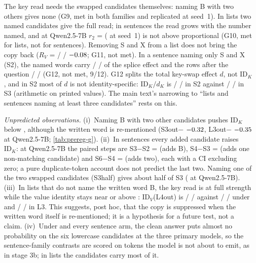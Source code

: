 The key read needs the swapped candidates themselves: naming B with two others gives none (G9, met in both families and replicated at seed~1). In lists two named candidates give the full read; in sentences the read grows with the number named, and at Qwen2.5-7B $r_2$ = \GtenSRtwoQwenSeven{} (\GtenSRtwoSeedoneQwenSeven{} at seed~1) is not above proportional (G10, met for lists, not for sentences). Removing S and X from a list does not bring the copy back ($R_V$ = \GelevenRVQwenSeven{} / \GelevenRVQwenFourteen{} / $-0.08$; G11, not met). In a sentence naming only S and X (S2), the named words carry \GtwelveStwoQwenSeven{} / \GtwelveStwoQwenFourteen{} / \GtwelveStwoMistralSeven{} of the splice effect and the rows after the question \GtwelveRestStwoQwenSeven{} / \GtwelveRestStwoQwenFourteen{} / \GtwelveRestStwoMistralSeven{} (G12, not met, 9/12). G12 splits the total key-swap effect $d$, not $\mathrm{ID}_K$, and in S2 most of $d$ is not identity-specific: $\mathrm{ID}_K/d_K$ is \GcShareStwoQwenSeven{} / \GcShareStwoQwenFourteen{} / \GcShareStwoMistralSeven{} in S2 against \GcShareSthreeQwenSeven{} / \GcShareSthreeQwenFourteen{} / \GcShareSthreeMistralSeven{} in S3 (arithmetic on printed values). The main text's narrowing to ``lists and sentences naming at least three candidates'' rests on this.

\emph{Unpredicted observations.} (i)~Naming B with two other candidates pushes $\mathrm{ID}_K$ below \fmtNone{}, although the written word is re-mentioned (S3out$-$\fmtNone{} $-0.32$, L3out$-$\fmtNone{} $-0.35$ at Qwen2.5-7B; \cref{tab:prereg-g}). (ii)~In sentences every added candidate raises $\mathrm{ID}_K$: at Qwen2.5-7B the paired steps are S3$-$S2 = \GtenSStepThreeTwoQwenSeven{} (adds B), S4$-$S3 = \GtenSStepFourThreeQwenSeven{} (adds one non-matching candidate) and S6$-$S4 = \GtenSStepSixFourQwenSeven{} (adds two), each with a CI excluding zero; a pure duplicate-token account does not predict the last two. Naming one of the two swapped candidates (S3half) gives about half of S3 (\GcHalfQwenSeven{} at Qwen2.5-7B). (iii)~In lists that do not name the written word B, the key read is at full strength while the value identity stays near or above \fmtNone{}: $\mathrm{ID}_V$(L4out) is \GcIDVLfouroutQwenSeven{} / \GcIDVLfouroutQwenFourteen{} / \GcIDVLfouroutMistralSeven{} against \GcIDVNoneQwenSeven{} / \GcIDVNoneQwenFourteen{} / \GcIDVNoneMistralSeven{} under \fmtNone{} and \GcIDVLthreeQwenSeven{} / \GcIDVLthreeQwenFourteen{} / \GcIDVLthreeMistralSeven{} in L3. This suggests, post hoc, that the copy is suppressed when the written word itself is re-mentioned; it is a hypothesis for a future test, not a claim. (iv)~Under \fmtNone{} and every sentence arm, the clean answer puts almost no probability on the six lowercase candidates at the three primary models, so the sentence-family contrasts are scored on tokens the model is not about to emit, as in stage 3b; in lists the candidates carry most of it.

